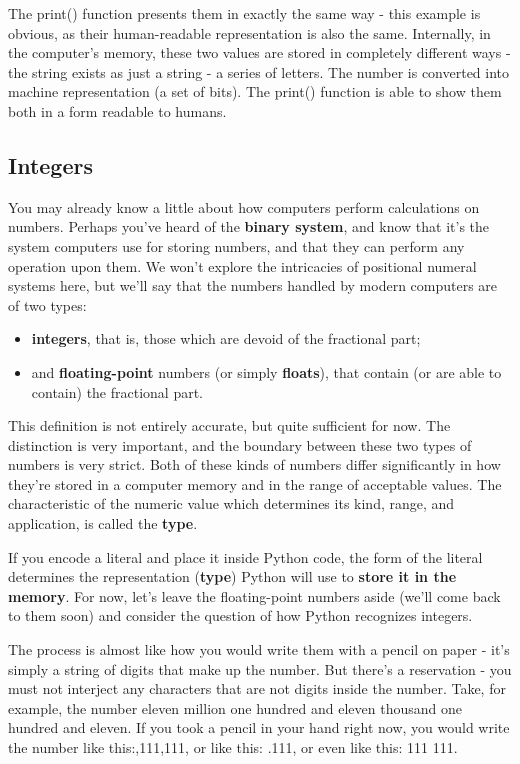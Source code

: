 \documentclass[a4paper,10pt]{article}
\begin{document}
The {\selectfont print()} function presents them in exactly the same way - this example is obvious, as their human-readable representation is also the same. Internally, in the computer's memory, these two values are stored in completely different ways - the string exists as just a string - a series of letters. The number is converted into machine representation (a set of bits). The {\selectfont print()} function is able to show them both in a form readable to humans.
\newline

\subsection{Integers}
You may already know a little about how computers perform calculations on numbers. Perhaps you've heard of the \textbf{binary system}, and know that it's the system computers use for storing numbers, and that they can perform any operation upon them. We won't explore the intricacies of positional numeral systems here, but we'll say that the numbers handled by modern computers are of two types:
\begin{itemize}
 \item \textbf{integers}, that is, those which are devoid of the fractional part;
 \item and \textbf{floating-point} numbers (or simply \textbf{floats}), that contain (or are able to contain) the fractional part.
\end{itemize}

This definition is not entirely accurate, but quite sufficient for now. The distinction is very important, and the boundary between these two types of numbers is very strict. Both of these kinds of numbers differ significantly in how they're stored in a computer memory and in the range of acceptable values. The characteristic of the numeric value which determines its kind, range, and application, is called the \textbf{type}.
\newline

If you encode a literal and place it inside Python code, the form of the literal determines the representation (\textbf{type}) Python will use to \textbf{store it in the memory}. For now, let's leave the floating-point numbers aside (we'll come back to them soon) and consider the question of how Python recognizes integers.
\newline

The process is almost like how you would write them with a pencil on paper - it's simply a string of digits that make up the number. But there's a reservation - you must not interject any characters that are not digits inside the number. Take, for example, the number eleven million one hundred and eleven thousand one hundred and eleven. If you took a pencil in your hand right now, you would write the number like this:{,111,111}, or like this: {.111}, or even like this: { 111 111}.
\newline
\end{document}
